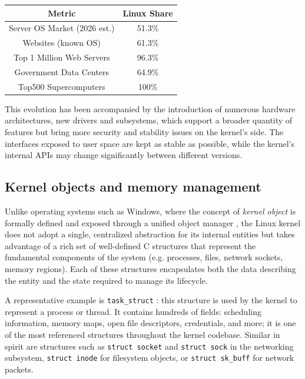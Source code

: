 \begin{table}[H]
    \centering
    \begin{tabular}{|c|c|}
        \hline
        \textbf{Metric} & \textbf{Linux Share} \\\hline
        Server OS Market (2026 est.) & 51.3\% \\\hline
        Websites (known OS) & 61.3\% \\\hline
        Top 1 Million Web Servers & 96.3\% \\\hline
        Government Data Centers & 64.9\% \\\hline
        Top500 Supercomputers & 100\% \\
        \hline
    \end{tabular}
\end{table}

\noindent This evolution has been accompanied by the introduction of numerous hardware architectures, new drivers and subsystems, which support a broader quantity of features but bring more security and stability issues on the kernel's side. The interfaces exposed to user space are kept as stable as possible, while the kernel's internal APIs may change significantly between different versions.

\subsection{Kernel objects and memory management}

Unlike operating systems such as Windows, where the concept of \textit{kernel object} is formally defined and exposed through a unified object manager \cite{bib:windows-kernel-object}, the Linux kernel does not adopt a single, centralized abstraction for its internal entities but takes advantage of a rich set of well-defined C structures that represent the fundamental components of the system (e.g. processes, files, network sockets, memory regions). Each of these structures encapsulates both the data describing the entity and the state required to manage its lifecycle.

A representative example is \texttt{task\_struct} \cite{bib:sched.h}: this structure is used by the kernel to represent a process or thread. It contains hundreds of fields: scheduling information, memory maps, open file descriptors, credentials, and more; it is one of the most referenced structures throughout the kernel codebase. Similar in spirit are structures such as \texttt{struct socket} \cite{bib:struct-socket} and \texttt{struct sock} \cite{bib:struct-sock} in the networking subsystem, \texttt{struct inode} \cite{bib:struct-inode} for filesystem objects, or \texttt{struct sk\_buff} \cite{bib:struct-sk-buff} for network packets.

